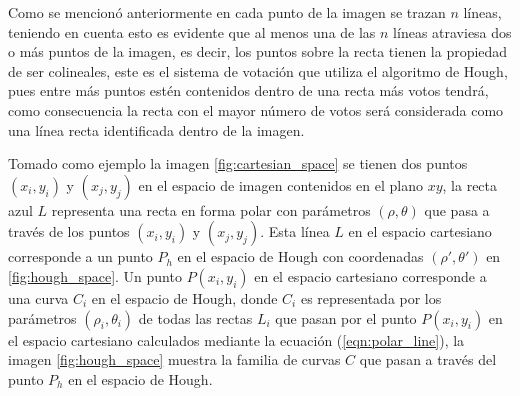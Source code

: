Como se mencionó anteriormente en cada punto de la imagen se trazan $n$ líneas, teniendo en cuenta esto es evidente que al menos una de las $n$ líneas atraviesa dos o más puntos de la imagen, es decir, los puntos sobre la recta tienen la propiedad de ser colineales, este es el sistema de votación que utiliza el algoritmo de Hough, pues entre más puntos estén contenidos dentro de una recta más votos tendrá, como consecuencia la recta con el mayor número de votos será considerada como una línea recta identificada dentro de la imagen.

Tomado como ejemplo la imagen \ref{fig:cartesian_space} se tienen dos puntos $(x_i, y_i)$ y $(x_j, y_j)$ en el espacio de imagen contenidos en el plano $xy$, la recta azul $L$ representa una recta en forma polar con parámetros $(\rho, \theta)$ que pasa a través de los puntos $(x_i, y_i)$ y $(x_j, y_j)$. Esta línea $L$ en el espacio cartesiano corresponde a un punto $P_h$ en el espacio de Hough con coordenadas $(\rho', \theta')$ en \ref{fig:hough_space}. Un punto $P(x_i, y_i)$ en el espacio cartesiano corresponde a una curva $C_i$ en el espacio de Hough, donde $C_i$ es  representada por los parámetros $(\rho_i, \theta_i)$ de todas las rectas $L_i$ que pasan por el punto $P(x_i, y_i)$ en el espacio cartesiano calculados mediante la ecuación (\ref{eqn:polar_line}), la imagen \ref{fig:hough_space} muestra la familia de curvas $C$ que pasan a través del punto $P_h$ en el espacio de Hough.

